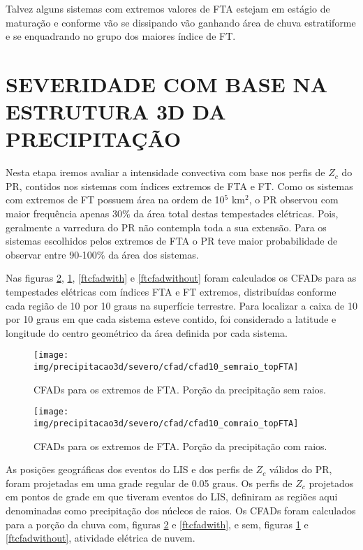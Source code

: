 Talvez alguns sistemas com extremos valores de FTA estejam em estágio de maturação e conforme vão se dissipando vão ganhando área de chuva estratiforme e se enquadrando no grupo dos maiores índice de FT. 



\section{SEVERIDADE COM BASE NA ESTRUTURA 3D DA PRECIPITAÇÃO}

Nesta etapa iremos avaliar a intensidade convectiva com base nos perfis de $Z_c$ do PR, contidos nos sistemas com índices extremos de FTA e FT. Como os sistemas com extremos de FT possuem área na ordem de 10$^5$ km$^2$, o PR observou com maior frequência apenas  30\% da área total destas tempestades elétricas. Pois, geralmente a varredura do PR não contempla toda a sua extensão. Para os sistemas escolhidos pelos extremos de FTA o PR teve maior probabilidade de observar entre 90-100\% da área dos sistemas.

Nas figuras \ref{ftacfadwith}, \ref{ftacfadwithout}, \ref{ftcfadwith} e \ref{ftcfadwithout} foram calculados os CFADs para as tempestades elétricas com índices FTA e FT extremos, distribuídas conforme cada região de 10 por 10 graus na superfície terrestre. Para localizar a caixa de 10 por 10 graus em que cada sistema esteve contido, foi considerado a latitude e longitude do centro geométrico da área definida por cada sistema.


\begin{figure}[!ht]
  \centering
  \texttt{[image: img/precipitacao3d/severo/cfad/cfad10\_semraio\_topFTA]}
 \caption{CFADs para os extremos de FTA. Porção da precipitação sem raios.}
 \label{ftacfadwithout}
\end{figure} 

\begin{figure}[!ht]
  \centering
  \texttt{[image: img/precipitacao3d/severo/cfad/cfad10\_comraio\_topFTA]}
  \caption{CFADs para os extremos de FTA. Porção da precipitação com raios.}
  \label{ftacfadwith}   
\end{figure} 

As posições geográficas dos eventos do LIS e dos perfis de $Z_c$ válidos do PR, foram projetadas em uma grade regular de 0.05 graus. Os perfis de $Z_c$ projetados em pontos de grade em que tiveram eventos do LIS, definiram as regiões aqui denominadas como precipitação dos núcleos de raios. Os CFADs foram calculados para a porção da chuva com, figuras \ref{ftacfadwith} e \ref{ftcfadwith}, e sem, figuras \ref{ftacfadwithout} e \ref{ftcfadwithout}, atividade elétrica de nuvem.

